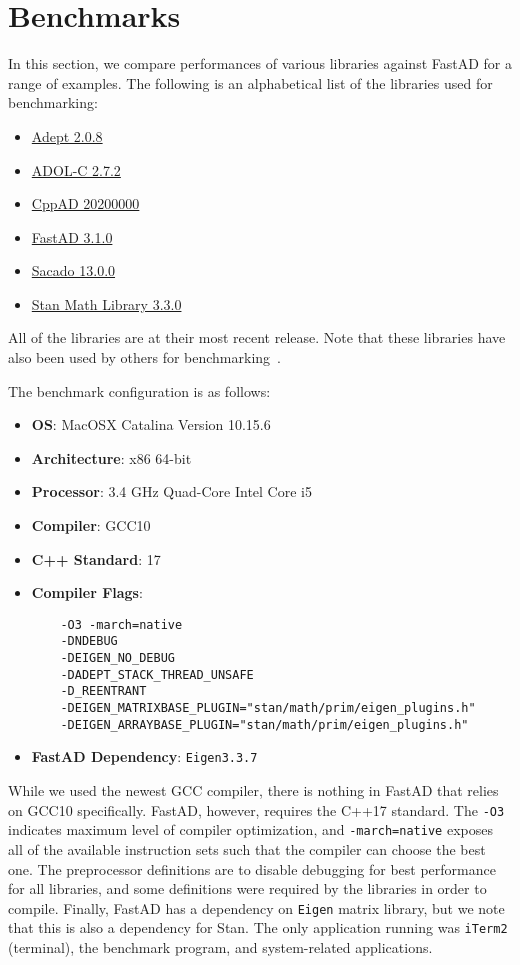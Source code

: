 \section{Benchmarks}

In this section, we compare performances of various libraries against FastAD for a range of examples.
The following is an alphabetical list of the libraries used for benchmarking:\@
\begin{itemize}
    \item \href{http://www.met.reading.ac.uk/clouds/adept/}{Adept 2.0.8}
    \item \href{https://github.com/coin-or/ADOL-C}{ADOL-C 2.7.2}
    \item \href{https://coin-or.github.io/CppAD/doc/cppad.htm}{CppAD 20200000}
    \item \href{https://github.com/JamesYang007/FastAD}{FastAD 3.1.0}
    \item \href{https://github.com/trilinos/Trilinos/tree/master/packages/sacado}{Sacado 13.0.0}
    \item \href{https://github.com/stan-dev/math}{Stan Math Library 3.3.0}
\end{itemize}
All of the libraries are at their most recent release.
Note that these libraries have also been used by others for 
benchmarking~\cite{carpenter:2015}\cite{margossian:2018}\cite{hogan:2014}.

The benchmark configuration is as follows:
\begin{itemize}
    \item \textbf{OS}: MacOSX Catalina Version 10.15.6 
    \item \textbf{Architecture}: x86 64-bit
    \item \textbf{Processor}: 3.4 GHz Quad-Core Intel Core i5
    \item \textbf{Compiler}: GCC10
    \item \textbf{C++ Standard}: 17
    \item \textbf{Compiler Flags}: 
\begin{verbatim}
    -O3 -march=native 
    -DNDEBUG 
    -DEIGEN_NO_DEBUG 
    -DADEPT_STACK_THREAD_UNSAFE 
    -D_REENTRANT 
    -DEIGEN_MATRIXBASE_PLUGIN="stan/math/prim/eigen_plugins.h" 
    -DEIGEN_ARRAYBASE_PLUGIN="stan/math/prim/eigen_plugins.h"
\end{verbatim}
    \item \textbf{FastAD Dependency}: \verb|Eigen3.3.7|
\end{itemize}
While we used the newest GCC compiler, there is nothing in FastAD that relies on GCC10 specifically.
FastAD, however, requires the C++17 standard.
The \verb|-O3| indicates maximum level of compiler optimization,
and \verb|-march=native| exposes all of the available instruction sets 
such that the compiler can choose the best one.
The preprocessor definitions are to disable debugging
for best performance for all libraries, and some definitions were required by the libraries in order to compile.
Finally, FastAD has a dependency on \verb|Eigen| matrix library,
but we note that this is also a dependency for Stan.
The only application running was \verb|iTerm2| (terminal),
the benchmark program, and system-related applications.

